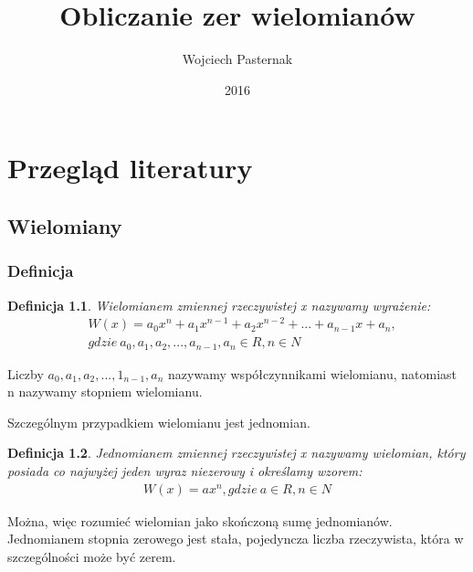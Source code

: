 \documentclass[twoside,a4paper]{book}
\title{Obliczanie zer wielomianów}
\author{Wojciech Pasternak}
\date{2016}
\newtheorem{definition}{Definicja}
\begin{document}
\frontmatter
\maketitle
\tableofcontents

\mainmatter

\chapter{Przegląd literatury}
\section{Wielomiany}
\subsection{Definicja}




\begin{definition}
	Wielomianem zmiennej rzeczywistej x nazywamy wyrażenie:
	\begin{equation}
		\begin{split}
			&W(x) = a_0x^n + a_1x^{n-1} + a_2x^{n-2}+ ... + a_{n-1}x + a_n, \\
			&gdzie\ a_0, a_1, a_2, ..., a_{n-1}, a_n\in R, n \in N 
		\end{split}
	\end{equation}
\end{definition}

Liczby $a_0, a_1, a_2, ..., 1_{n-1}, a_n$ nazywamy współczynnikami wielomianu, natomiast n nazywamy stopniem wielomianu.
	
Szczególnym przypadkiem wielomianu jest jednomian. 

\begin{definition}
	Jednomianem zmiennej rzeczywistej x nazywamy wielomian, który posiada co najwyżej jeden wyraz niezerowy i określamy wzorem:
	\begin{equation}
		\begin{split}
			W(x) = ax^n, gdzie\ a\in R, n \in N 
		\end{split}
	\end{equation}
\end{definition}

Można, więc rozumieć wielomian jako skończoną sumę jednomianów.
Jednomianem stopnia zerowego jest stała, pojedyncza liczba rzeczywista, która w szczególności może być zerem.
\end{document}
